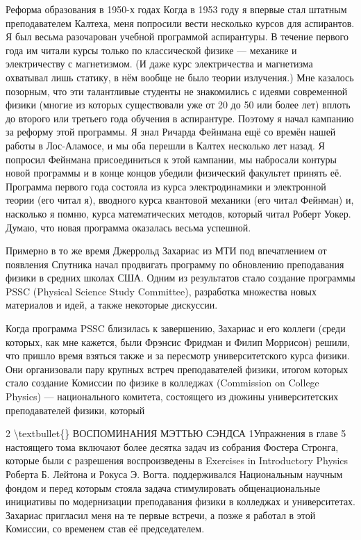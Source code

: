 \documentclass[10pt,oneside]{article}
\begin{document}
Реформа образования в 1950-х годах Когда в 1953 году я впервые стал штатным преподавателем Калтеха, меня попросили вести несколько курсов для аспирантов. Я был весьма разочарован учебной программой аспирантуры. В течение первого года им читали курсы только по классической физике --- механике и электричеству с магнетизмом. (И даже курс электричества и магнетизма охватывал лишь статику, в нём вообще не было теории излучения.) Мне казалось позорным, что эти талантливые студенты не знакомились с идеями современной физики (многие из которых существовали уже от 20 до 50 или более лет) вплоть до второго или третьего года обучения в аспирантуре. Поэтому я начал кампанию за реформу этой программы. Я знал Ричарда Фейнмана ещё со времён нашей работы в Лос-Аламосе, и мы оба перешли в Калтех несколько лет назад. Я попросил Фейнмана присоединиться к этой кампании, мы набросали контуры новой программы и в конце концов убедили физический факультет принять её. Программа первого года состояла из курса электродинамики и электронной теории (его читал я), вводного курса квантовой механики (его читал Фейнман) и, насколько я помню, курса математических методов, который читал Роберт Уокер. Думаю, что новая программа оказалась весьма успешной.\par

Примерно в то же время Джеррольд Захариас из МТИ под впечатлением от появления Спутника начал продвигать программу по обновлению преподавания физики в средних школах США. Одним из результатов стало создание программы PSSC (Physical Science Study Committee), разработка множества новых материалов и идей, а также некоторые дискуссии.\par

Когда программа PSSC близилась к завершению, Захариас и его коллеги (среди которых, как мне кажется, были Фрэнсис Фридман и Филип Моррисон) решили, что пришло время взяться также и за пересмотр университетского курса физики. Они организовали пару крупных встреч преподавателей физики, итогом которых стало создание Комиссии по физике в колледжах (Commission on College Physics) --- национального комитета, состоящего из дюжины университетских преподавателей физики, который\par

2 \textbackslash{}textbullet\{\} ВОСПОМИНАНИЯ МЭТТЬЮ СЭНДСА 1Упражнения в главе 5 настоящего тома включают более десятка задач из собрания Фостера Стронга, которые были с разрешения воспроизведены в Exercises in Introductory Physics Роберта Б. Лейтона и Рокуса Э. Вогта. поддерживался Национальным научным фондом и перед которым стояла задача стимулировать общенациональные инициативы по модернизации преподавания физики в колледжах и университетах. Захариас пригласил меня на те первые встречи, а позже я работал в этой Комиссии, со временем став её председателем.\par
\end{document}
